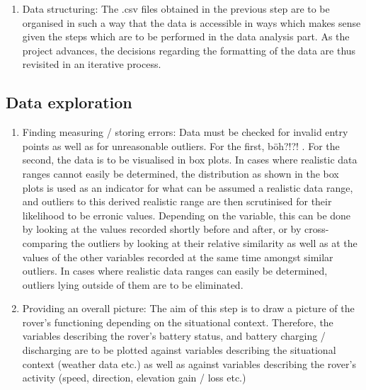 \documentclass[11pt, UKenglish]{report}
\begin{document}
{\begin{enumerate}
	\item{\large{Data structuring:} \normalsize  The .csv files obtained in the previous step are to be organised in such a way that the data is accessible in ways which makes sense given the steps which are to be performed in the data analysis part. As the project advances, the decisions regarding the formatting of the data are thus revisited in an iterative process.}

\end{enumerate}

\subsection*{Data exploration}

\begin{enumerate}

	\item{\large{Finding measuring / storing errors:} \normalsize Data must be checked for invalid entry points as well as for unreasonable outliers. For the first, böh?!?! . For the second, the data is to be visualised in box plots. In cases where realistic data ranges cannot easily be determined, the distribution as shown in the box plots is used as an indicator for what can be assumed a realistic data range, and outliers to this derived realistic range are then scrutinised for their likelihood to be erronic values. Depending on the variable, this can be done by looking at the values recorded shortly before and after, or by cross-comparing the outliers by looking at their relative similarity as well as at the values of the other variables recorded at the same time amongst similar outliers. In cases where realistic data ranges can easily be determined, outliers lying outside of them are to be eliminated.}

	\item{\large{Providing an overall picture:} \normalsize The aim of this step is to draw a picture of the rover's functioning depending on the situational context. Therefore, the variables describing the rover's battery status, and battery charging / discharging are to be plotted against variables describing the situational context (weather data etc.) as well as against variables describing the rover's activity (speed, direction, elevation gain / loss etc.)}

\end{enumerate}

}
\end{document}
